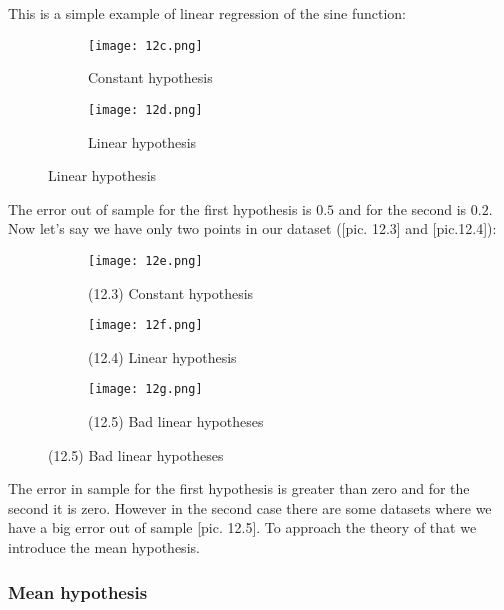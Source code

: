 This is a simple example of linear regression of the sine function:
\begin{figure}[H]
  \centering
  \begin{subfigure}[c]{0.25\linewidth}
    \texttt{[image: 12c.png]}
    \caption*{Constant hypothesis}
  \end{subfigure}
  \hspace{2cm}
  \begin{subfigure}[c]{0.25\linewidth}
    \texttt{[image: 12d.png]}
    \caption*{Linear hypothesis}
  \end{subfigure}
\end{figure}
The error out of sample for the first hypothesis is $0.5$ and for the second is $0.2$. Now let's say we have only two points in our dataset ([pic. 12.3] and [pic.12.4]):
\begin{figure}[H]
  \centering
  \begin{subfigure}[c]{0.26\linewidth}
    \texttt{[image: 12e.png]}
    \caption*{(12.3) Constant hypothesis}
  \end{subfigure}
  \hspace{1cm}
  \begin{subfigure}[c]{0.26\linewidth}
    \texttt{[image: 12f.png]}
    \caption*{(12.4) Linear hypothesis}
  \end{subfigure}
  \hspace{1cm}
  \begin{subfigure}[c]{0.28\linewidth}
    \texttt{[image: 12g.png]}
    \caption*{(12.5) Bad linear hypotheses}
  \end{subfigure}
\end{figure}
The error in sample for the first hypothesis is greater than zero and for the second it is zero. However in the second case there are some datasets where we have a big error out of sample [pic. 12.5]. To approach the theory of that we introduce the mean hypothesis.

\subsubsection*{Mean hypothesis}

